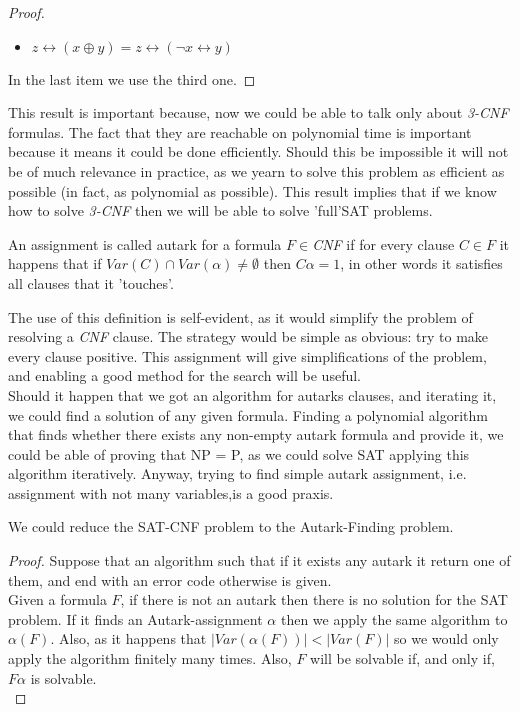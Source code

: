 \begin{definition}
\begin{proof}
\begin{itemize}
      \item $z \leftrightarrow( x \oplus y ) =  z \leftrightarrow(\neg  x \leftrightarrow y )  $	

      \end{itemize}
      In the last item we use the third one.
      
    \end{proof}
    This result is important because, now we could be able to talk only about \emph{3-CNF} formulas. The fact that they are reachable on polynomial time is important because it means it could be done efficiently. Should this be impossible it will not be of much relevance in practice, as we yearn to solve this problem as efficient as possible (in fact, as polynomial as possible). This result implies that if we know how to solve \emph{3-CNF} then we will be able to solve 'full'SAT problems.
    \begin{definition}
      An assignment \alpha is called autark for a formula $F\in$\emph{CNF} if for every clause $C \in F$ it happens that if $Var(C) \cap Var(\alpha) \ne \emptyset $ then $C\alpha = 1$, in other words it satisfies all clauses that it 'touches'. 
    \end{definition}

    The use of this definition is self-evident, as it would simplify the problem of resolving a \emph{CNF} clause. The strategy would be simple as obvious: try to make every clause positive. This assignment will give simplifications of the problem, and enabling a good method for the search will be useful.\\ 

    Should it happen that we got an algorithm for autarks clauses, and iterating it, we could find a solution of any given formula. Finding a polynomial algorithm that finds whether there exists any non-empty autark formula and provide it, we could be able of proving that NP = P, as we could solve SAT applying this algorithm iteratively. Anyway, trying to find simple autark assignment, i.e. assignment with not many variables,is a good praxis.

    \begin{proposition} We could reduce the SAT-CNF problem to the Autark-Finding problem.
      \begin{proof} Suppose that an algorithm such that if it exists any autark it return one of them, and end with an error code otherwise is given.  \\

        Given a formula $F$, if there is not an autark then there is no solution for the SAT problem. If it finds an Autark-assignment $\alpha$ then we apply the same algorithm to $\alpha(F)$. Also, as it happens that $|Var(\alpha(F))|<|Var(F)|$ so we would only apply the algorithm finitely many times. Also, $F$ will be solvable if, and only if, $F\alpha$ is solvable.	\\


\end{proof}
\end{proposition}
\end{definition}
